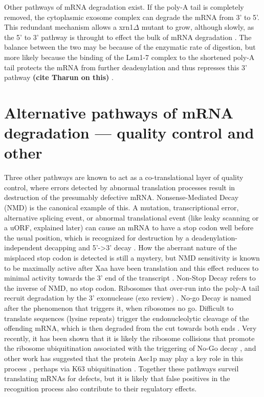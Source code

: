 Other pathways
of mRNA degradation exist. If the poly-A tail is completely removed,
the cytoplasmic exosome complex can degrade the mRNA from 3’ to 5’.
This redundant mechanism allows a xrn1$\Delta$ mutant to grow, although
slowly, as the 5’ to 3’ pathway is throught to effect the bulk of mRNA
degradation 
\parencite{parker2012rna}. 
The balance between the two may be because
of the enzymatic rate of digestion, but more likely because the
binding of the Lsm1-7 complex to the shortened poly-A tail protects
the mRNA from further deadenylation and thus represses this 3’ pathway
\textbf{(cite Tharun on this)}
.

\section{Alternative pathways of mRNA degradation ---
quality control and other }

Three other pathways are known to act as a
co-translational layer of quality control, where errors detected by
abnormal translation processes result in destruction of the presumably
defective mRNA. Nonsense-Mediated Decay (NMD) is the canonical example
of this. A mutation, transcriptional error, alternative splicing
event, or abnormal translational event (like leaky scanning or a uORF,
explained later) can cause an mRNA to have a stop codon well before
the usual position, which is recognized for destruction by a
deadenylation-independent decapping and 5’->3’ decay 
\parencite{muhlrad1994premature}. 
How the aberrant nature of the misplaced stop codon is
detected is still a mystery, but NMD sensitivity is known to be
maximally active after Xaa have been translation and this effect
reduces to minimal activity towards the 3’ end of the transcript
\parencite{losson1979interference}. 
Non-Stop Decay refers to the inverse of
NMD, no stop codon. Ribosomes that over-run into the poly-A tail
recruit degradation by the 3’ exonuclease 
(exo review)
. No-go Decay is
named after the phenomenon that triggers it, when ribosomes no go.
Difficult to translate sequences (lysine repeats) trigger the
endonucleolytic cleavage of the offending mRNA, which is then degraded
from the cut towards both ends 
\parencite{doma2006endonucleolytic}. Very recently,
it has been shown that it is likely the ribosome collisions that
promote the ribosome ubiquitination associated with the triggering of
No-Go decay 
\parencite{simms2017ribosome}, and other work has suggested that the
protein Asc1p may play a key role in this process 
\parencite{ikeuchi2016ribosome}, perhaps via K63 ubiquitination 
\parencite{saito2015inhibiting}. Together
these pathways surveil translating mRNAs for defects, but it is likely
that false positives in the recognition process also contribute to
their regulatory effects.  

